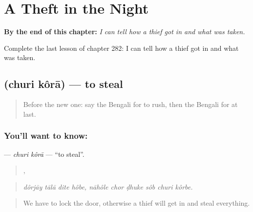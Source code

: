 
\chapter{A Theft in the Night}
\label{ch:bn-a-theft-in-the-night}

\begin{chapteropening}
\textbf{By the end of this chapter:} \emph{I can tell how a thief got in and what was taken.}

Complete the last lesson of chapter 282: I can tell how a thief got in and what was taken.
\end{chapteropening}

\section[\texorpdfstring{\bn{চুরি} \bn{করা} (churi kôrā)}{চুরি করা (churi kôrā)}]{  (churi kôrā) — to steal}

\label{lesson:BN-C282-churi-kora}



\begin{quote}
Before the new one: say the Bengali for to rush, then the Bengali for at last.
\end{quote}

\subsection*{You'll want to know:  }
\textbf{ } — \emph{churi kôrā} — \textquotedblleft{}to steal\textquotedblright{}.

\begin{quote}
   ,      
\end{quote}

\begin{quote}
\emph{dôrjāy tālā dite hôbe, nāhôle chor ḍhuke sôb churi kôrbe.}
\end{quote}

\begin{quote}
We have to lock the door, otherwise a thief will get in and steal everything.
\end{quote}

